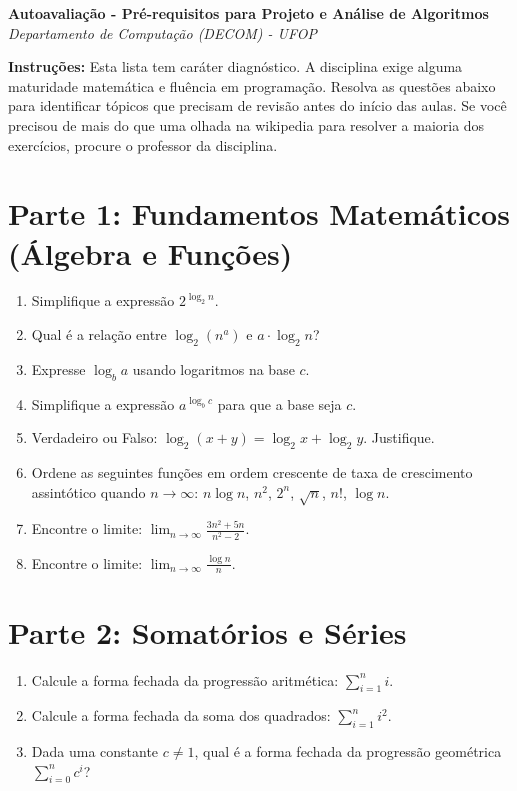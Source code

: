 \documentclass[10pt,a4paper]{article}
\begin{document}
\begin{center}
    {\Large \textbf{Autoavaliação - Pré-requisitos para Projeto e Análise de Algoritmos}}\\[0.2cm]
    \textit{Departamento de Computação (DECOM) - UFOP}
\end{center}

\noindent\textbf{Instruções:} Esta lista tem caráter diagnóstico. A disciplina exige alguma maturidade matemática e fluência em programação. Resolva as questões abaixo para identificar tópicos que precisam de revisão antes do início das aulas. Se você precisou de mais do que uma olhada na wikipedia para resolver a maioria dos exercícios, procure o professor da disciplina. 

\vspace{0.3cm}

\section*{Parte 1: Fundamentos Matemáticos (Álgebra e Funções)}
\begin{enumerate}[leftmargin=*, itemsep=2pt, parsep=0pt]
    \item Simplifique a expressão $2^{\log_2 n}$.
    \item Qual é a relação entre $\log_2(n^a)$ e $a \cdot \log_2 n$?
    \item Expresse $\log_b a$ usando logaritmos na base $c$.
    \item Simplifique a expressão $a^{\log_b c}$ para que a base seja $c$.
    \item Verdadeiro ou Falso: $\log_2(x + y) = \log_2 x + \log_2 y$. Justifique.
    \item Ordene as seguintes funções em ordem crescente de taxa de crescimento assintótico quando $n \to \infty$: $n \log n$, $n^2$, $2^n$, $\sqrt{n}$, $n!$, $\log n$.
    \item Encontre o limite: $\lim_{n \to \infty} \frac{3n^2 + 5n}{n^2 - 2}$.
    \item Encontre o limite: $\lim_{n \to \infty} \frac{\log n}{n}$.
\end{enumerate}

\section*{Parte 2: Somatórios e Séries}
\begin{enumerate}[leftmargin=*, itemsep=2pt, parsep=0pt, resume]
    \item Calcule a forma fechada da progressão aritmética: $\sum_{i=1}^{n} i$.
    \item Calcule a forma fechada da soma dos quadrados: $\sum_{i=1}^{n} i^2$.
    \item Dada uma constante $c \neq 1$, qual é a forma fechada da progressão geométrica $\sum_{i=0}^{n} c^i$?
\end{enumerate}
\end{document}
